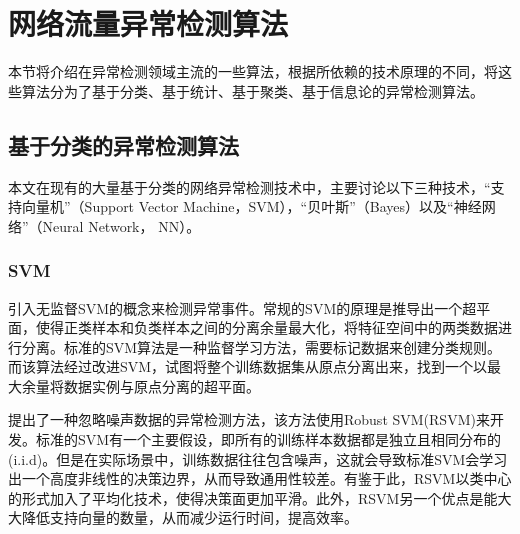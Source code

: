 \section{网络流量异常检测算法}


本节将介绍在异常检测领域主流的一些算法，根据所依赖的技术原理的不同，将这些算法分为了基于分类、基于统计、基于聚类、基于信息论的异常检测算法。

\subsection{基于分类的异常检测算法}



本文在现有的大量基于分类的网络异常检测技术中，主要讨论以下三种技术，“支持向量机”（Support Vector Machine，SVM），“贝叶斯”（Bayes）以及“神经网络”（Neural Network， NN）。

\subsubsection{SVM}
\citet{2002AEskin} 引入无监督SVM的概念来检测异常事件。常规的SVM的原理是推导出一个超平面，使得正类样本和负类样本之间的分离余量最大化，将特征空间中的两类数据进行分离。标准的SVM算法是一种监督学习方法，需要标记数据来创建分类规则。而该算法经过改进SVM，试图将整个训练数据集从原点分离出来，找到一个以最大余量将数据实例与原点分离的超平面。

\citet{Hu2003Robust} 提出了一种忽略噪声数据的异常检测方法，该方法使用Robust SVM(RSVM)来开发。标准的SVM有一个主要假设，即所有的训练样本数据都是独立且相同分布的(i.i.d)。但是在实际场景中，训练数据往往包含噪声，这就会导致标准SVM会学习出一个高度非线性的决策边界，从而导致通用性较差。有鉴于此，RSVM以类中心的形式加入了平均化技术，使得决策面更加平滑。此外，RSVM另一个优点是能大大降低支持向量的数量，从而减少运行时间，提高效率。

